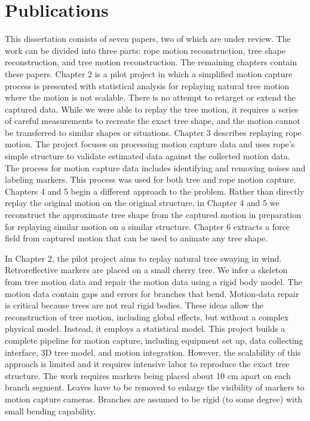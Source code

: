 \section{Publications}
This dissertation consists of seven papers, two of which are under review.  The work can be divided into three parts: rope motion reconstruction, tree shape reconstruction, and tree motion reconstruction. The remaining chapters contain these papers.  Chapter 2 is a pilot project in which a simplified motion capture process is presented with statistical analysis for replaying natural tree motion where the motion is not scalable. There is no attempt to retarget or extend the captured data. While we were able to replay the tree motion, it requires a series of careful measurements to recreate the exact tree shape, and the motion cannot be transferred to similar shapes or situations. Chapter 3 describes replaying rope motion. The project focuses on processing motion capture data and uses rope's simple structure to validate estimated data against the collected motion data. The process for motion capture data includes identifying and removing noises and labeling markers. This process was used for both tree and rope motion capture. Chapters 4 and 5 begin a different approach to the problem.  Rather than directly replay the original motion on the original structure, in Chapter 4 and 5 we reconstruct the approximate tree shape from the captured motion in preparation for replaying similar motion on a similar structure. Chapter 6 extracts a force field from captured motion that can be used to animate any tree shape.  

In Chapter 2, the pilot project aims to replay natural tree swaying in wind. Retroreflective markers are placed on a small cherry tree. We infer a skeleton from tree motion data and repair the motion data using a rigid body model. The motion data contain gaps and errors for branches that bend. Motion-data repair is critical because trees are not real rigid bodies. These ideas allow the reconstruction of tree motion, including global effects, but without a complex physical model. Instead, it employs a statistical model. This project builds a complete pipeline for motion capture, including equipment set up, data collecting interface, 3D tree model, and motion integration. However, the scalability of this approach is limited and it requires intensive labor to reproduce the exact tree structure. The work requires markers being placed about 10 cm apart on each branch segment. Leaves have to be removed to enlarge the visibility of markers to motion capture cameras. Branches are assumed to be rigid (to some degree) with small bending capability. 

